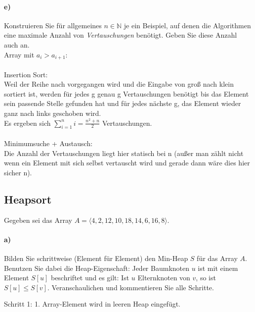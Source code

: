 \documentclass[paper=a4, fontsize=11pt]{scrartcl}
\numberwithin{equation}{section}
\numberwithin{figure}{section}
\numberwithin{table}{section}
\begin{document}
\paragraph{e)} Konstruieren Sie für allgemeines $n\in \mathbb N$ je ein Beispiel, auf denen die Algorithmen eine maximale Anzahl von \textit{Vertauschungen} benötigt. Geben Sie diese Anzahl auch an. \\

Array mit $a_{i}>a_{i+1}$:\\
\\
Insertion Sort:\\
Weil der Reihe nach vorgegangen wird und die Eingabe von groß nach klein sortiert ist, werden für jedes g genau g Vertauschungen benötigt bis das Element sein passende Stelle gefunden hat und für jedes nächste g, das Element wieder ganz nach links geschoben wird.\\
Es ergeben sich $\sum_{i=1}^n i = \frac{n^2+n}{2}$ Vertauschungen.\\
\\
Minimumsuche + Austausch:\\
Die Anzahl der Vertauschungen liegt hier statisch bei n (außer man zählt nicht wenn ein Element mit sich selbst vertauscht wird und gerade dann wäre dies hier sicher n).

\subsection{Heapsort}
Gegeben sei das Array $A=\langle 4,2,12,10,18,14,6,16,8 \rangle$. 

\paragraph{a)}
Bilden Sie schrittweise (Element für Element) den Min-Heap $S$ für das Array $A$. Benutzen Sie dabei die Heap-Eigenschaft: Jeder Baumknoten $u$ ist mit einem Element $S[u]$ beschriftet und es gilt: Ist $u$ Elternknoten von $v$, so ist $S[u] \leq S[v]$. Veranschaulichen und kommentieren Sie alle Schritte. \\

\begin{center}
\end{center}
Schritt 1: 1. Array-Element wird in leeren Heap eingefügt.\\
\end{document}
